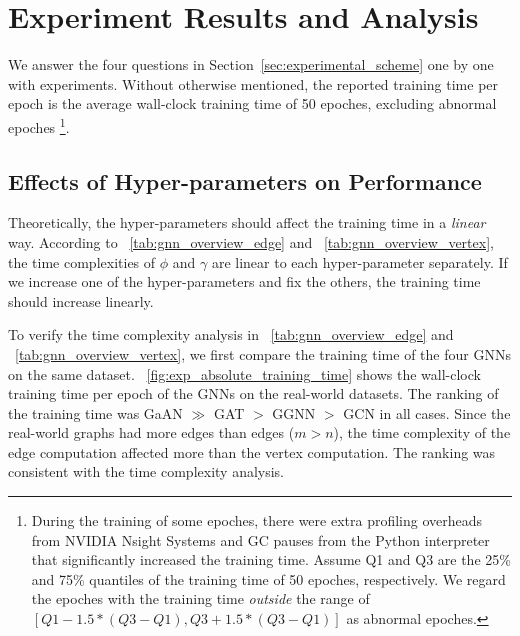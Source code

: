 \section{Experiment Results and Analysis}
\label{sec:experiment_results}

We answer the four questions in Section~\ref{sec:experimental_scheme} one by one with experiments.
Without otherwise mentioned, the reported training time per epoch is the average wall-clock training time of 50 epoches, excluding abnormal epoches \footnote{During the training of some epoches, there were extra profiling overheads from NVIDIA Nsight Systems and GC pauses from the Python interpreter that significantly increased the training time. Assume Q1 and Q3 are the 25\% and 75\% quantiles of the training time of 50 epoches, respectively. We regard the epoches with the training time \emph{outside} the range of $[Q1 - 1.5 * (Q3-Q1), Q3 + 1.5 * (Q3-Q1)]$ as abnormal epoches.}.

\subsection{Effects of Hyper-parameters on Performance}
\label{sec:effects_of_hyper-parameters_on_performance}

Theoretically, the hyper-parameters should affect the training time in a \emph{linear} way.
According to \tablename~\ref{tab:gnn_overview_edge} and \tablename~\ref{tab:gnn_overview_vertex}, the time complexities of $\phi$ and $\gamma$ are linear to each hyper-parameter separately.
If we increase one of the hyper-parameters and fix the others, the training time should increase linearly.

To verify the time complexity analysis in \tablename~\ref{tab:gnn_overview_edge} and \tablename~\ref{tab:gnn_overview_vertex}, we first compare the training time of the four GNNs on the same dataset.
\figurename~\ref{fig:exp_absolute_training_time} shows the wall-clock training time per epoch of the GNNs on the real-world datasets.
The ranking of the training time was GaAN $\gg$ GAT $>$ GGNN $>$ GCN in all cases.
Since the real-world graphs had more edges than edges ($m > n$), the time complexity of the edge computation affected more than the vertex computation.
The ranking was consistent with the time complexity analysis.

